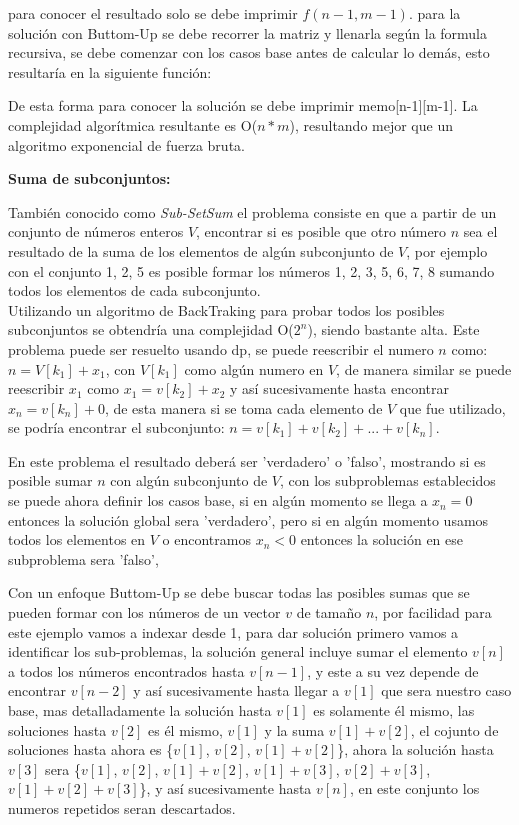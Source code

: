 \documentclass[12pt, a4paper]{article}
\newcommand\cppfile[2][]{

}
\newcommand{\subtitulo}[1]{\begin{center}\textbf{#1}\end{center}}
\begin{document}
	para conocer el resultado solo se debe imprimir $f(n-1, m-1)$. para la solución con Buttom-Up se debe recorrer 
	la matriz y llenarla según la formula recursiva, se debe comenzar con los casos base antes de calcular lo demás, 
	esto resultaría en la siguiente función:
	\cppfile[22-35]{codigos/matriz.cpp}
	De esta forma para conocer la solución se debe imprimir memo[n-1][m-1]. La complejidad algorítmica resultante
	es O($n*m$), resultando mejor que un algoritmo exponencial de fuerza bruta.\\
	
	\subtitulo{Suma de subconjuntos:}
	
	También conocido como \textit{Sub-SetSum} el problema consiste en que a partir de un conjunto de números enteros
	$V$, encontrar si es posible que otro número $n$ sea el resultado de la suma de los elementos de algún
	subconjunto de $V$, por ejemplo con el conjunto {1, 2, 5} es posible formar los números
	{1, 2, 3, 5, 6, 7, 8} sumando todos los elementos de cada subconjunto.\\
	
	Utilizando un algoritmo de BackTraking para probar todos los posibles subconjuntos se obtendría una complejidad
	O($2^{n}$), siendo bastante alta. Este problema puede ser resuelto usando dp, se puede reescribir el numero $n$
	como: $n=V[k_{1}]+x_{1}$, con $V[k_{1}]$ como algún numero en $V$, de manera similar se puede reescribir $x_{1}$
	como $x_{1}=v[k_{2}]+x_{2}$ y así sucesivamente hasta encontrar $x_{n}=v[k_{n}]+0$, de esta manera si se toma 
	cada elemento de $V$ que fue utilizado, se podría encontrar el subconjunto: $n=v[k_{1}]+v[k_{2}]+...+v[k_{n}]$.
	
	En este problema el resultado deberá ser 'verdadero' o 'falso', mostrando si es posible sumar $n$ con algún 
	subconjunto de $V$, con los subproblemas establecidos se puede ahora definir los casos base, si en algún momento 
	se llega a $x_{n}=0$ entonces la solución global sera 'verdadero', pero si en algún momento usamos todos los
	elementos en $V$ o encontramos $x_{n}<0$ entonces la solución en ese subproblema sera 'falso',
	
	
	
	Con un enfoque Buttom-Up se debe buscar todas las posibles sumas que se pueden formar con los números de un vector 
	$v$ de tamaño $n$,
	por facilidad para este ejemplo vamos a indexar desde 1, para dar solución primero vamos a identificar los
	sub-problemas, la solución general incluye sumar el elemento $v[n]$ a todos los números encontrados
	hasta $v[n-1]$, y este a su vez depende de encontrar $v[n-2]$ y así sucesivamente hasta llegar a $v[1]$
	que sera nuestro caso base, mas detalladamente la solución hasta $v[1]$ es solamente él mismo, las soluciones
	hasta $v[2]$ es él mismo, $v[1]$ y la suma $v[1]+v[2]$, el cojunto de soluciones hasta ahora es
	\{$v[1]$, $v[2]$, $v[1]+v[2]$\}, ahora la solución hasta $v[3]$ sera
	\{$v[1]$, $v[2]$, $v[1]+v[2]$, $v[1]+v[3]$, $v[2]+v[3]$, $v[1]+v[2]+v[3]$\}, y así sucesivamente hasta $v[n]$,
	en este conjunto los numeros repetidos seran descartados.\\
	
\end{document}
